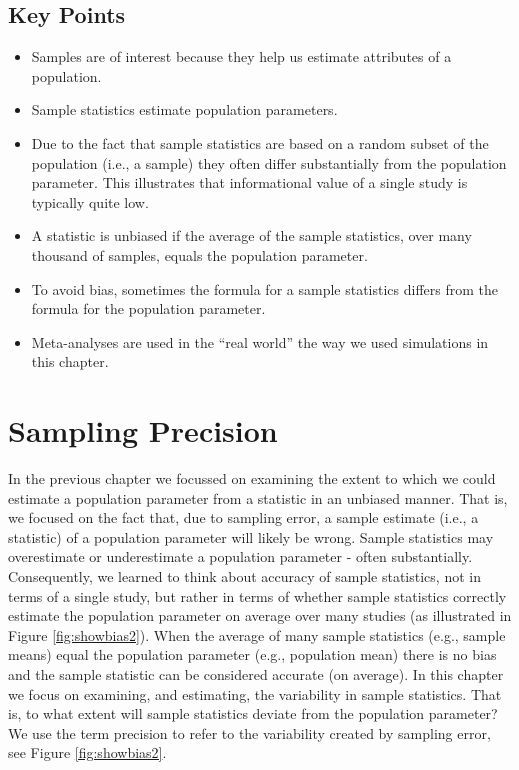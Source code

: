 \documentclass[
]{krantz}
\begin{document}
\hypertarget{key-points-1}{%
\section{Key Points}\label{key-points-1}}

\begin{itemize}
\item
  Samples are of interest because they help us estimate attributes of a population.
\item
  Sample statistics estimate population parameters.
\item
  Due to the fact that sample statistics are based on a random subset of the population (i.e., a sample) they often differ substantially from the population parameter. This illustrates that informational value of a single study is typically quite low.
\item
  A statistic is unbiased if the average of the sample statistics, over many thousand of samples, equals the population parameter.
\item
  To avoid bias, sometimes the formula for a sample statistics differs from the formula for the population parameter.
\item
  Meta-analyses are used in the ``real world'' the way we used simulations in this chapter.
\end{itemize}

\hypertarget{sampling-precision}{%
\chapter{Sampling Precision}\label{sampling-precision}}

In the previous chapter we focussed on examining the extent to which we could estimate a population parameter from a statistic in an unbiased manner. That is, we focused on the fact that, due to sampling error, a sample estimate (i.e., a statistic) of a population parameter will likely be wrong. Sample statistics may overestimate or underestimate a population parameter - often substantially. Consequently, we learned to think about accuracy of sample statistics, not in terms of a single study, but rather in terms of whether sample statistics correctly estimate the population parameter on average over many studies (as illustrated in Figure \ref{fig:showbias2}). When the average of many sample statistics (e.g., sample means) equal the population parameter (e.g., population mean) there is no bias and the sample statistic can be considered accurate (on average). In this chapter we focus on examining, and estimating, the variability in sample statistics. That is, to what extent will sample statistics deviate from the population parameter? We use the term precision to refer to the variability created by sampling error, see Figure \ref{fig:showbias2}.
\end{document}

